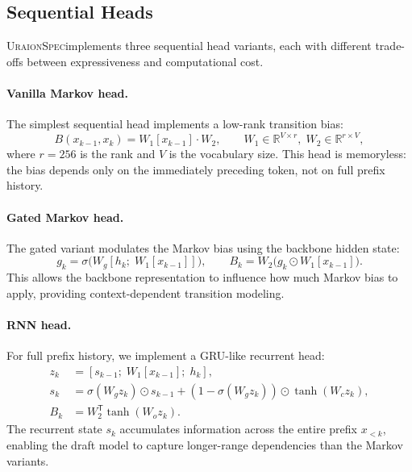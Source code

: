 \documentclass[11pt,a4paper]{article}
\newcommand{\UraionSpec}{\textsc{UraionSpec}}
\begin{document}
\subsection{Sequential Heads}
\label{subsec:sequential-heads}

\UraionSpec implements three sequential head variants, each with
different trade-offs between expressiveness and computational cost.

\paragraph{Vanilla Markov head.}
The simplest sequential head implements a low-rank transition bias:
\begin{equation}
  B(x_{k-1}, x_k) = W_1[x_{k-1}] \cdot W_2,
  \qquad
  W_1 \in \mathbb{R}^{V \times r},\; W_2 \in \mathbb{R}^{r \times V},
\end{equation}
where $r = 256$ is the rank and $V$ is the vocabulary size. This head is
memoryless: the bias depends only on the immediately preceding token, not
on full prefix history.

\paragraph{Gated Markov head.}
The gated variant modulates the Markov bias using the backbone hidden state:
\begin{equation}
  g_k = \sigma\bigl(W_g [h_k ;\; W_1[x_{k-1}]]\bigr), \qquad
  B_k = W_2\bigl(g_k \odot W_1[x_{k-1}]\bigr).
\end{equation}
This allows the backbone representation to influence how much Markov bias to
apply, providing context-dependent transition modeling.

\paragraph{RNN head.}
For full prefix history, we implement a GRU-like recurrent head:
\begin{align}
  z_k &= [s_{k-1} ;\; W_1[x_{k-1}] ;\; h_k], \\
  s_k &= \sigma(W_g z_k) \odot s_{k-1} + (1 - \sigma(W_g z_k)) \odot \tanh(W_c z_k), \\
  B_k &= W_2^{\mathsf{T}} \tanh(W_o z_k).
\end{align}
The recurrent state $s_k$ accumulates information across the entire prefix
$x_{<k}$, enabling the draft model to capture longer-range dependencies
than the Markov variants.
\end{document}

